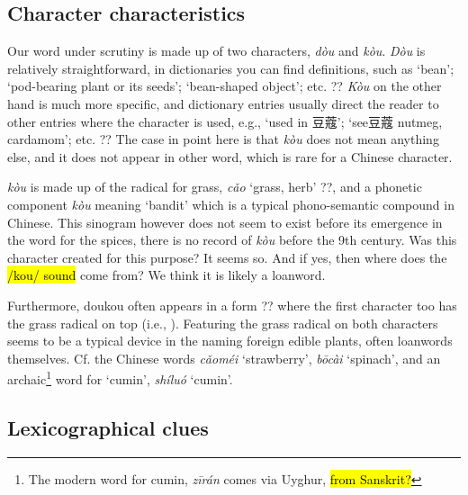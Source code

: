 \documentclass[12pt]{article}
\newcommand{\tc}[1]{\traditionalchinesefont{#1}\rmfamily}
\begin{document}


\subsection{Character characteristics}

Our word under scrutiny is made up of two characters, \tc{豆} \textit{dòu} and \tc{蔻} \textit{kòu}. \textit{Dòu} is relatively straightforward, in dictionaries you can find definitions, such as `bean'; `pod-bearing plant or its seeds'; `bean-shaped object'; etc. ?? \textit{Kòu} on the other hand is much more specific, and dictionary entries usually direct the reader to other entries where the character is used, e.g., `used in 豆蔻'; `see豆蔻 nutmeg, cardamom'; etc. ?? The case in point here is that \textit{kòu} does not mean anything else, and it does not appear in other word, which is rare for a Chinese character. 

\tc{蔻} \textit{kòu} is made up of the radical for grass, \tc{艹} \textit{cǎo} `grass, herb' ??, and a phonetic component \tc{寇} \textit{kòu} meaning `bandit' which is a typical phono-semantic compound in Chinese. This sinogram however does not seem to exist before its emergence in the word for the spices, there is no record of \tc{蔻} \textit{kòu} before the 9th century. Was this character created for this purpose? It seems so. And if yes, then where does the \hl{/kou/ sound} come from? We think it is likely a loanword.

Furthermore, doukou often appears in a form ?? where the first character too has the grass radical on top (i.e., \tc{荳蔻}). Featuring the grass radical on both characters seems to be a typical device in the naming foreign edible plants, often loanwords themselves. Cf. the Chinese words \tc{草莓} \textit{cǎoméi} `strawberry', \tc{菠菜} \textit{bōcài} `spinach', and an archaic\footnote{The modern word for cumin, \tc{孜然} \textit{zī​rán} comes via Uyghur, \hl{from Sanskrit?}} word for `cumin', \tc{蒔蘿} \textit{shíluó} `cumin'.

\subsection{Lexicographical clues}
\end{document}
